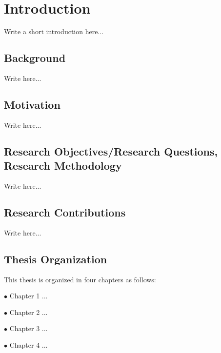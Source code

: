 \chapter{Introduction}

Write a short introduction here...

\section{Background}

Write here...

\section{Motivation}

Write here... 

\section{Research Objectives/Research Questions, Research Methodology}

Write here...

\section{Research Contributions}

Write here...

\section{Thesis Organization}

This thesis is organized in four chapters as follows:

$\bullet $ Chapter 1 ...  

$\bullet $ Chapter 2 ...

$\bullet $ Chapter 3 ... 

$\bullet $ Chapter 4 ...
